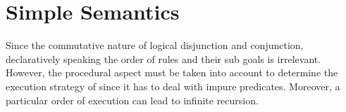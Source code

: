 \documentclass[thesis-solanki.tex]{subfiles}
\begin{document}

\section{Simple Semantics}

Since the commutative nature of logical disjunction and conjunction, declaratively speaking the order of rules and their sub goals is
irrelevant. However, the procedural aspect must be taken into account to determine the execution strategy of  since it
has to deal with impure predicates. Moreover, a particular order of execution can lead to infinite recursion.
\end{document}
